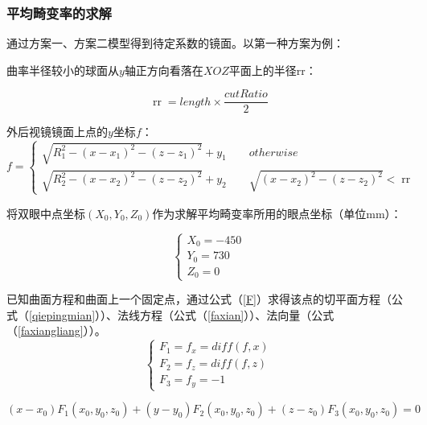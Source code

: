 \documentclass[withoutpreface,bwprint]{cumcmthesis} %
\begin{document}
\subsubsection{平均畸变率的求解}

\par 通过方案一、方案二模型得到待定系数的镜面。以第一种方案为例：
\par 曲率半径较小的球面从$y$轴正方向看落在$XOZ$平面上的半径rr：

\begin{equation}
	\mathop{rr} = length \times \frac{cutRatio}{2}
\end{equation}

\par 外后视镜镜面上点的$y$坐标$f$：
\begin{equation}
	f = 
	\begin{cases}
		\sqrt{R_1^2 - (x-x_1)^2 - (z - z_1)^2} + y_1\quad \quad otherwise
		\\
		\sqrt{R_2^2 - (x-x_2)^2 - (z - z_2)^2} + y_2 \quad \quad 
		\sqrt{(x-x_2)^2 - (z - z_2)^2} < \mathop{rr} 
	\end{cases} 
\end{equation}

\par 将双眼中点坐标$(X_0,Y_0,Z_0)$作为求解平均畸变率所用的眼点坐标（单位mm）：

\begin{equation}
	\begin{cases}
		X_0 = -450 \\ 
		Y_0 = 730 \\
		Z_0 = 0 
	\end{cases} 
\end{equation}




\par 已知曲面方程和曲面上一个固定点，通过公式（\ref{F}）求得该点的切平面方程（公式（\ref{qiepingmian}））、法线方程（公式（\ref{faxian}））、法向量（公式（\ref{faxiangliang}））。
\begin{equation}
\label{F}
	\begin{cases}
		F_1 = f_x = diff(f,x) \\
		F_2 = f_z = diff(f,z) \\
		F_3 = f_y = -1
	\end{cases}
\end{equation}

\begin{equation}
\label{qiepingmian}
	(x - x_0)F_1(x_0,y_0,z_0) + (y - y_0)F_2(x_0,y_0,z_0) + (z - z_0)F_3(x_0,y_0,z_0) = 0
\end{equation}
\end{document}

